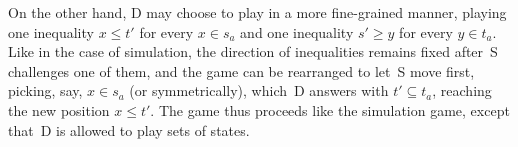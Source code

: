 \documentclass[sigconf,
			final%
			nonacm
                        ]{acmart}
\numberwithin{equation}{section}
\numberwithin{equation}{section}
\theoremstyle{plain}
\newtheorem{propn}[thm]{Proposition}
\theoremstyle{definition}
\newcommand{\mybar}[3]{%
  \mathrlap{\hspace{#2}\overline{\scalebox{#1}[1]{\hphantom{\ensuremath{#3}}\vphantom{\rule{0pt}{5.5pt}}}}}\ensuremath{#3}
}
\newcommand{\barZ}{\mybar{0.7}{1.75pt}{Z}}
\newcommand{\T}{\mathcal{T}}                     %
\newcommand{\A}{\mathcal{A}}            %
\begin{document}
On the other hand, D may choose to play in a more fine-grained manner,
playing one inequality $x\le t'$ for every $x\in s_a$ and one
inequality $s'\ge y$ for every $y\in t_a$. Like in the case of
simulation, the direction of inequalities remains fixed after~S
challenges one of them, and the game can be rearranged to let~S move
first, picking, say, $x\in s_a$ (or symmetrically), which~D answers
with $t'\subseteq t_a$, reaching the new position $x\le t'$. The game
thus proceeds like the simulation game, except that~D is allowed to
play sets of states.


\end{document}
